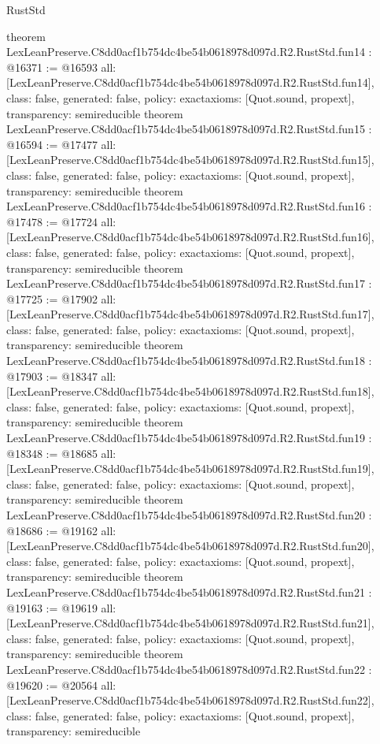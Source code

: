 \begin{lexlean}{RustStd}
\begin{coremodule}
{}
theorem LexLeanPreserve.C8dd0acf1b754dc4be54b0618978d097d.R2.RustStd.fun14 : @16371 := @16593 {
  all: [LexLeanPreserve.C8dd0acf1b754dc4be54b0618978d097d.R2.RustStd.fun14],
  class: false,
  generated: false,
  policy: exact{axioms: [Quot.sound, propext]},
  transparency: semireducible
}
theorem LexLeanPreserve.C8dd0acf1b754dc4be54b0618978d097d.R2.RustStd.fun15 : @16594 := @17477 {
  all: [LexLeanPreserve.C8dd0acf1b754dc4be54b0618978d097d.R2.RustStd.fun15],
  class: false,
  generated: false,
  policy: exact{axioms: [Quot.sound, propext]},
  transparency: semireducible
}
theorem LexLeanPreserve.C8dd0acf1b754dc4be54b0618978d097d.R2.RustStd.fun16 : @17478 := @17724 {
  all: [LexLeanPreserve.C8dd0acf1b754dc4be54b0618978d097d.R2.RustStd.fun16],
  class: false,
  generated: false,
  policy: exact{axioms: [Quot.sound, propext]},
  transparency: semireducible
}
theorem LexLeanPreserve.C8dd0acf1b754dc4be54b0618978d097d.R2.RustStd.fun17 : @17725 := @17902 {
  all: [LexLeanPreserve.C8dd0acf1b754dc4be54b0618978d097d.R2.RustStd.fun17],
  class: false,
  generated: false,
  policy: exact{axioms: [Quot.sound, propext]},
  transparency: semireducible
}
theorem LexLeanPreserve.C8dd0acf1b754dc4be54b0618978d097d.R2.RustStd.fun18 : @17903 := @18347 {
  all: [LexLeanPreserve.C8dd0acf1b754dc4be54b0618978d097d.R2.RustStd.fun18],
  class: false,
  generated: false,
  policy: exact{axioms: [Quot.sound, propext]},
  transparency: semireducible
}
theorem LexLeanPreserve.C8dd0acf1b754dc4be54b0618978d097d.R2.RustStd.fun19 : @18348 := @18685 {
  all: [LexLeanPreserve.C8dd0acf1b754dc4be54b0618978d097d.R2.RustStd.fun19],
  class: false,
  generated: false,
  policy: exact{axioms: [Quot.sound, propext]},
  transparency: semireducible
}
theorem LexLeanPreserve.C8dd0acf1b754dc4be54b0618978d097d.R2.RustStd.fun20 : @18686 := @19162 {
  all: [LexLeanPreserve.C8dd0acf1b754dc4be54b0618978d097d.R2.RustStd.fun20],
  class: false,
  generated: false,
  policy: exact{axioms: [Quot.sound, propext]},
  transparency: semireducible
}
theorem LexLeanPreserve.C8dd0acf1b754dc4be54b0618978d097d.R2.RustStd.fun21 : @19163 := @19619 {
  all: [LexLeanPreserve.C8dd0acf1b754dc4be54b0618978d097d.R2.RustStd.fun21],
  class: false,
  generated: false,
  policy: exact{axioms: [Quot.sound, propext]},
  transparency: semireducible
}
theorem LexLeanPreserve.C8dd0acf1b754dc4be54b0618978d097d.R2.RustStd.fun22 : @19620 := @20564 {
  all: [LexLeanPreserve.C8dd0acf1b754dc4be54b0618978d097d.R2.RustStd.fun22],
  class: false,
  generated: false,
  policy: exact{axioms: [Quot.sound, propext]},
  transparency: semireducible
}
\end{coremodule}
\end{lexlean}

